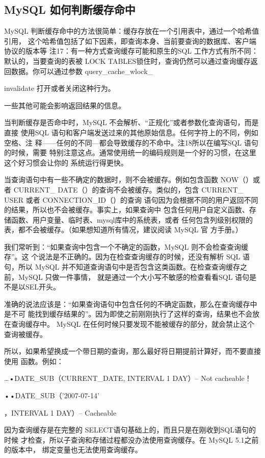 \subsection{MySQL 如何判断缓存命中}
MySQL 判断缓存命中的方法很简单：缓存存放在一个引用表中，通过一个哈希值引用，
这个哈希值包括了如下因素，即查询本身、当前要查询的数据库、客户端协议的版本等
注17：有一种方式查询缓存可能和原生的SQL 工作方式有所不同：默认的，当要查询的表被 LOCK
TABLES锁住时，查询仍然可以通过查询缓存返回数据。你可以通过参数 query\_cache\_wlock\_

invalidate 打开或者关闭这种行为。

一些其他可能会影响返回结果的信息。

当判断缓存是否命中时，MySQL 不会解析、“正规化”或者参数化查询语句，而是直接
使用SQL 语句和客户端发送过来的其他原始信息。任何字符上的不同，例如空格、注
释——任何的不同—都会导致缓存的不命中。注18所以在编写SQL 语句的时候，需要
特别注意这点。通常使用统一的编码规则是一个好的习惯，在这里这个好习惯会让你的
系统运行得更快。

当查询语句中有一些不确定的数据时，则不会被缓存。例如包含函数 NOW（）或者 CURRENT\_
DATE（）的查询不会被缓存。类似的，包含 CURRENT\_ USER 或者 CONNECTION\_ID（）的查询
语句因为会根据不同的用户返回不同的结果，所以也不会被缓存。事实上，如果查询中
包含任何用户自定义函数、存储函数、用户变量、临时表、mysql库中的系统表，或者
任何包含列级别权限的表，都不会被缓存。（如果想知道所有情况，建议阅读 MySQL 官
方手册。）

我们常听到：“如果查询中包含一个不确定的函数，MySQL 则不会检查查询缓存”。这
个说法是不正确的。因为在检查查询缓存的时候，还没有解析 SQL 语句，所以 MySQL
并不知道查询语句中是否包含这类函数。在检查查询缓存之前，MySQL 只做一件事情，
就是通过一个大小写不敏感的检查看看SQL 语句是不是以SEL开头。

准确的说法应该是：“如果查询语句中包含任何的不确定函数，那么在查询缓存中是不可
能找到缓存结果的”。因为即使之前刚刚执行了这样的查询，结果也不会放在查询缓存中。
MySQL 在任何时候只要发现不能被缓存的部分，就会禁止这个查询被缓存。

所以，如果希望换成一个带日期的查询，那么最好将日期提前计算好，而不要直接使用
函数。例如：

…•DATE\_SUB（CURRENT\_DATE, INTERVAL 1 DAY）-- Not cacheable！

••DATE\_SUB（'2007-07-14’

，INTERVAL 1 DAY）-- Cacheable

因为查询缓存是在完整的 SELECT语句基础上的，而且只是在刚收到SQL语句的时候
才检查，所以子查询和存储过程都没办法使用查询缓存。在 MySQL 5.1之前的版本中，
绑定变量也无法使用查询缓存。

